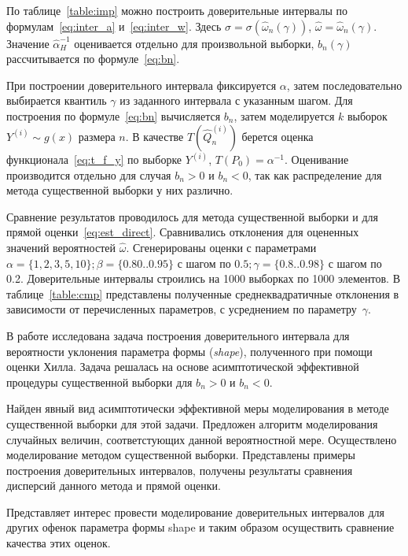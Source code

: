 \documentclass[12pt, specialist, subf, substylefile = spbu.rtx]{disser}
\begin{document}
По таблице~\ref{table:imp} можно построить доверительные интервалы по формулам~\eqref{eq:inter_a} и~\eqref{eq:inter_w}. Здесь $\sigma=\sigma(\hat{\omega}_n(\gamma))$, $\hat{\omega}=\hat{\omega}_n(\gamma)$. Значение $\hat{\alpha}_H^{-1}$ оценивается отдельно для произвольной выборки, $b_n(\gamma)$ рассчитывается по формуле~\eqref{eq:bn}.

При построении доверительного интервала фиксируется $\alpha$, затем последовательно выбирается квантиль $\gamma$ из заданного интервала с указанным шагом. Для построения по формуле~\eqref{eq:bn} вычисляется $b_n$, затем моделируется $k$ выборок $Y^{(i)} \sim g(x)$ размера $n$. В качестве $T(\hat{Q}^{(i)}_n)$ берется оценка функционала~\eqref{eq:t_f_y} по выборке $Y^{(i)}$, $T(P_0)=\alpha^{-1}$. Оценивание производится отдельно для случая $b_n > 0$ и $b_n < 0$, так как распределение для метода существенной выборки у них различно.



Сравнение результатов проводилось для метода существенной выборки и для прямой оценки~\eqref{eq:est_direct}. Сравнивались отклонения для оцененных значений вероятностей $\hat{\omega}$. Сгенерированы оценки с параметрами $\alpha = \{1,2,3,5,10\}; \beta=\{0.80..0.95\}$ с шагом по $0.5; \gamma=\{0.8..0.98\}$ с шагом по 0.2. Доверительные интервалы строились на 1000 выборках по 1000 элементов. В таблице~\ref{table:cmp} представлены полученные среднеквадратичные отклонения в зависимости от перечисленных параметров, с усреднением по параметру~$\gamma$.


\conclusion

В работе исследована задача построения доверительного интервала для вероятности уклонения параметра формы (\textit{shape}), полученного при помощи оценки Хилла. Задача решалась на основе асимптотической эффективной процедуры существенной выборки для $b_n>0$ и $b_n<0$.

Найден явный вид асимптотически эффективной меры моделирования в методе существенной выборки для этой задачи. Предложен алгоритм моделирования случайных величин, соответстующих данной вероятностной мере. Осуществлено моделирование методом существенной выборки. Представлены примеры построения доверительных интервалов, получены результаты сравнения дисперсий данного метода и прямой оценки. 

Представляет интерес провести моделирование доверительных интервалов для других офенок параметра формы shape и таким образом осуществить сравнение качества этих оценок.
\end{document}
